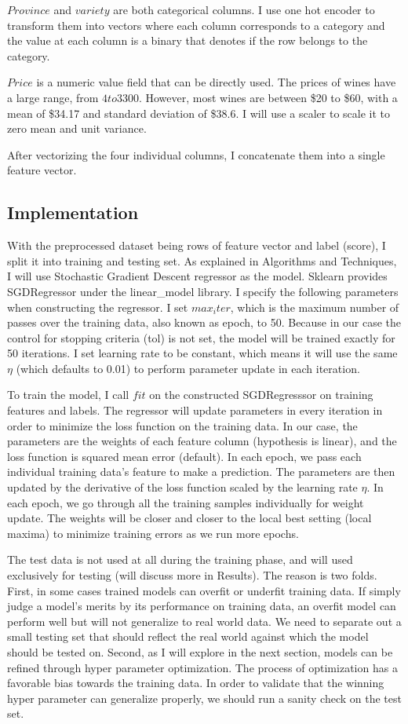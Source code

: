 \documentclass{article}
\begin{document}
$Province$ and $variety$ are both categorical columns. I use one hot encoder to transform them into vectors where each column corresponds to a category and the value at each column is a binary that denotes if the row belongs to the category.

$Price$ is a numeric value field that can be directly used. The prices of wines have a large range, from $4 to $3300. However, most wines are between \$20 to \$60, with a mean of \$34.17 and standard deviation of \$38.6. I will use a scaler to scale it to zero mean and unit variance.

After vectorizing the four individual columns, I concatenate them into a single feature vector.

\subsection{Implementation}
With the preprocessed dataset being rows of feature vector and label (score), I split it into training and testing set. As explained in Algorithms and Techniques, I will use Stochastic Gradient Descent regressor as the model. Sklearn provides SGDRegressor under the linear\_model library. I specify the following parameters when constructing the regressor. I set $max_iter$, which is the maximum number of passes over the training data, also known as epoch, to 50. Because in our case the control for stopping criteria (tol) is not set, the model will be trained exactly for 50 iterations. I set learning rate to be constant, which means it will use the same $\eta$ (which defaults to 0.01) to perform parameter update in each iteration. 

To train the model, I call $fit$ on the constructed SGDRegresssor on training features and labels. The regressor will update parameters in every iteration in order to minimize the loss function on the training data. In our case, the parameters are the weights of each feature column (hypothesis is linear), and the loss function is squared mean error (default). In each epoch, we pass each individual training data's feature to make a prediction. The parameters are then updated by the derivative of the loss function scaled by the learning rate $\eta$. In each epoch, we go through all the training samples individually for weight update. The weights will be closer and closer to the local best setting (local maxima) to minimize training errors as we run more epochs.

The test data is not used at all during the training phase, and will used exclusively for testing (will discuss more in Results). The reason is two folds. First, in some cases trained models can overfit or underfit training data. If simply judge a model's merits by its performance on training data, an overfit model can perform well but will not generalize to real world data. We need to separate out a small testing set that should reflect the real world against which the model should be tested on. Second, as I will explore in the next section, models can be refined through hyper parameter optimization. The process of optimization has a favorable bias towards the training data. In order to validate that the winning hyper parameter can generalize properly, we should run a sanity check on the test set.
\end{document}
